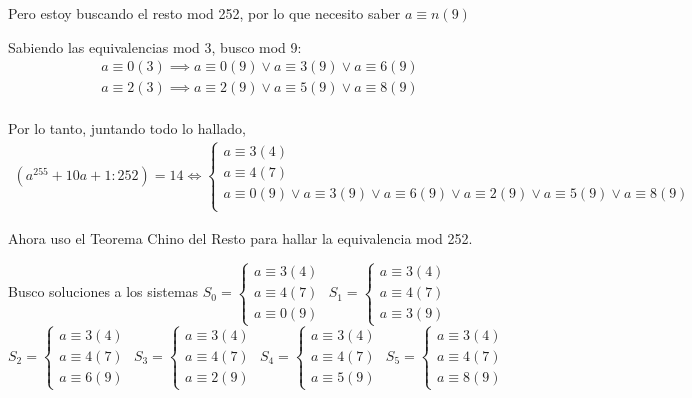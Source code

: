 Pero estoy buscando el resto mod 252, por lo que necesito saber $ a \equiv n (9) $

Sabiendo las equivalencias mod 3, busco mod 9:
\begin{align*}
    a \equiv 0 (3) \implies a \equiv 0 (9) \vee a \equiv 3 (9) \vee a \equiv 6 (9) \\
    a \equiv 2 (3) \implies a \equiv 2 (9) \vee a \equiv 5 (9) \vee a \equiv 8 (9) \\
\end{align*}

Por lo tanto, juntando todo lo hallado,
\begin{align*}
    (a^{255} + 10a + 1:252) = 14 \iff \begin{cases}
        a \equiv 3(4) \\
        a \equiv 4(7) \\
        a \equiv 0 (9) \vee a \equiv 3 (9) \vee a \equiv 6 (9) \vee a \equiv 2 (9) \vee a \equiv 5 (9) \vee a \equiv 8 (9) \\
    \end{cases}
\end{align*}

Ahora uso el Teorema Chino del Resto para hallar la equivalencia mod 252.

Busco soluciones a los sistemas
$ S_0 = \begin{cases}
    a \equiv 3(4) \\
    a \equiv 4(7) \\
    a \equiv 0(9)
\end{cases} $
$ S_1 = \begin{cases}
    a \equiv 3(4) \\
    a \equiv 4(7) \\
    a \equiv 3(9)
\end{cases} $
$ S_2 = \begin{cases}
    a \equiv 3(4) \\
    a \equiv 4(7) \\
    a \equiv 6(9)
\end{cases} $
$ S_3 = \begin{cases}
    a \equiv 3(4) \\
    a \equiv 4(7) \\
    a \equiv 2(9)
\end{cases} $
$ S_4 = \begin{cases}
    a \equiv 3(4) \\
    a \equiv 4(7) \\
    a \equiv 5(9)
\end{cases} $
$ S_5 = \begin{cases}
    a \equiv 3(4) \\
    a \equiv 4(7) \\
    a \equiv 8(9)
\end{cases} $

